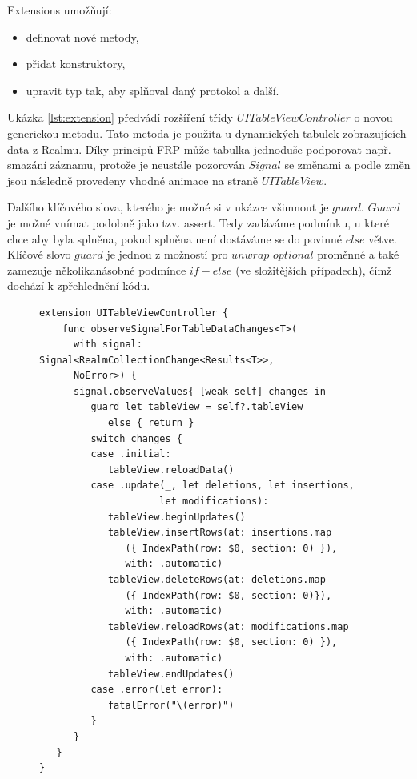 \documentclass[thesis=M,czech]{FITthesis}[2012/06/26]
\begin{document}
Extensions umožňují: 
\begin{itemize}
	\item definovat nové metody,
	\item přidat konstruktory, 
	\item upravit typ tak, aby splňoval daný protokol a další. \cite{devExtensions}
\end{itemize}

Ukázka \ref{lst:extension} předvádí rozšíření třídy $UITableViewController$ o novou generickou metodu. Tato metoda je použita u dynamických tabulek zobrazujících data z Realmu. Díky principů FRP může tabulka jednoduše podporovat např. smazání záznamu, protože je neustále pozorován $Signal$ se změnami a podle změn jsou následně provedeny vhodné animace na straně $UITableView$.

Dalšího klíčového slova, kterého je možné si v ukázce všimnout je $guard$. $Guard$ je možné vnímat podobně jako tzv. assert. Tedy zadáváme podmínku, u které chce aby byla splněna, pokud splněna není dostáváme se do povinné $else$ větve. Klíčové slovo $guard$ je jednou z možností pro $unwrap$ $optional$ proměnné a také zamezuje několikanásobné podmínce $if-else$ (ve složitějších případech), čímž dochází k zpřehlednění kódu. \cite{devGuard}

\begin{figure}
\begin{minipage}{\linewidth}
\begin{lstlisting}[caption={Ukázka Extension},label={lst:extension}]
extension UITableViewController {
    func observeSignalForTableDataChanges<T>(
      with signal: Signal<RealmCollectionChange<Results<T>>,
      NoError>) {
      signal.observeValues{ [weak self] changes in
         guard let tableView = self?.tableView
            else { return }
         switch changes {
         case .initial:
            tableView.reloadData()
         case .update(_, let deletions, let insertions,
                     let modifications):
            tableView.beginUpdates()
            tableView.insertRows(at: insertions.map
               ({ IndexPath(row: $0, section: 0) }),
               with: .automatic)
            tableView.deleteRows(at: deletions.map
               ({ IndexPath(row: $0, section: 0)}),
               with: .automatic)
            tableView.reloadRows(at: modifications.map
               ({ IndexPath(row: $0, section: 0) }),
               with: .automatic)
            tableView.endUpdates()
         case .error(let error):
            fatalError("\(error)")
         }
      }
   }
}
\end{lstlisting}
\end{minipage}
\end{figure}
	
\end{document}
